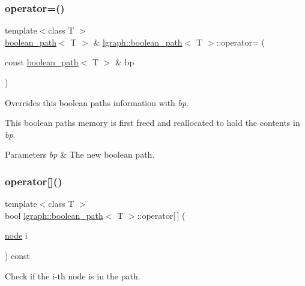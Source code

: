 \subsubsection{\texorpdfstring{operator=()}{operator=()}}
{\footnotesize\ttfamily template$<$class T $>$ \\
\hyperlink{classlgraph_1_1boolean__path}{boolean\+\_\+path}$<$ T $>$ \& \hyperlink{classlgraph_1_1boolean__path}{lgraph\+::boolean\+\_\+path}$<$ T $>$\+::operator= (\begin{DoxyParamCaption}\item[{const \hyperlink{classlgraph_1_1boolean__path}{boolean\+\_\+path}$<$ T $>$ \&}]{bp }\end{DoxyParamCaption})}



Overrides this boolean path\textquotesingle{}s information with {\itshape bp}. 

This boolean path\textquotesingle{}s memory is first freed and reallocated to hold the contents in {\itshape bp}.


\begin{DoxyParams}{Parameters}
{\em bp} & The new boolean path. \\
\hline
\end{DoxyParams}
\mbox{\label{classlgraph_1_1boolean__path_a16895c9aebb5e989489b4523a7b6696a}} 
\subsubsection{\texorpdfstring{operator[]()}{operator[]()}}
{\footnotesize\ttfamily template$<$class T $>$ \\
bool \hyperlink{classlgraph_1_1boolean__path}{lgraph\+::boolean\+\_\+path}$<$ T $>$\+::operator\mbox{[}$\,$\mbox{]} (\begin{DoxyParamCaption}\item[{\hyperlink{namespacelgraph_a397169dd66adf725210a30fb7251773e}{node}}]{i }\end{DoxyParamCaption}) const}



Check if the i-\/th node is in the path. 


